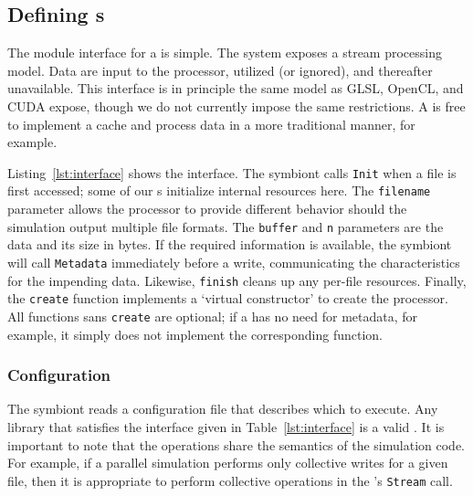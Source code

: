 \subsection{Defining \freeprocessor{}s}

The module interface for a \freeprocessor{} is simple.  The system
exposes a stream processing model.  Data are input to the processor,
utilized (or ignored), and thereafter unavailable.  This interface is
in principle the same model as GLSL, OpenCL, and CUDA expose, though we do not
currently impose the same restrictions.  A \freeprocessor{} is free to
implement a cache and process data in a more traditional manner, for
example.

Listing~\ref{lst:interface} shows the \freeprocessor{} interface.
The symbiont calls \texttt{Init} when a file is first accessed; some of
our \freeprocessor{}s initialize internal resources here.  The
\texttt{filename} parameter allows the processor to provide different
behavior should the simulation output multiple file formats.  The
\texttt{buffer} and \texttt{n} parameters are the data and its size in
bytes.  If the required information is available, the symbiont will call
\texttt{Metadata} immediately before a write, communicating the
characteristics for the impending data.  Likewise,
\texttt{finish} cleans up
any per-file resources.  Finally, the \texttt{create} function
implements a `virtual constructor' to create the processor.
All functions sans \texttt{create} are optional; if a
\freeprocessor{} has no need for metadata, for example, it simply does
not implement the corresponding function.

\begin{minipage}{\linewidth}

\vspace{-0.01em}
\end{minipage}

\subsubsection{Configuration}

The symbiont reads a configuration file that describes
which \freeprocessor{}
to execute.  Any library that satisfies the interface given in
Table~\ref{lst:interface} is a valid \freeprocessor{}.  It is important
to note that the operations share the semantics of the simulation code.
For example, if a parallel simulation performs only collective writes
for a given file, then it is appropriate to perform
collective operations in the \freeprocessor{}'s \texttt{Stream} call.

